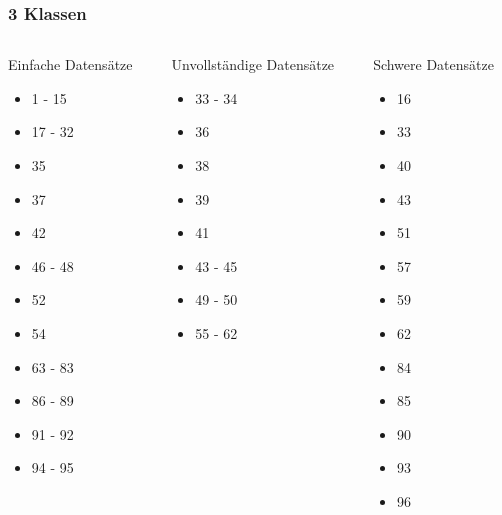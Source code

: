

\begin{frame}
  \frametitle{3 Klassen}
\begin{columns}
  \begin{column}{0.33\textwidth}
  Einfache Datensätze
  \begin{itemize}
  \item 1 - 15
  \item 17 - 32
  \item 35
  \item 37
  \item 42
  \item 46 - 48
  \item 52
  \item 54
  \item 63 - 83
  \item 86 - 89
  \item 91 - 92
  \item 94 - 95
  \end{itemize}
  \end{column}
    \begin{column}{0.33\textwidth}
    Unvollständige Datensätze
    \begin{itemize}
    \item 33 - 34
    \item 36
    \item 38
    \item 39
    \item 41
    \item 43 - 45
    \item 49 - 50
    \item 55 - 62
    \end{itemize}
    \end{column}
  \begin{column}{0.33\textwidth}
  Schwere Datensätze
  \begin{itemize}
  \item 16
  \item 33
  \item 40
  \item 43
  \item 51
  \item 57
  \item 59
  \item 62
  \item 84
  \item 85
  \item 90
  \item 93
  \item 96
  \end{itemize}
  \end{column}
\end{columns}
\end{frame}
